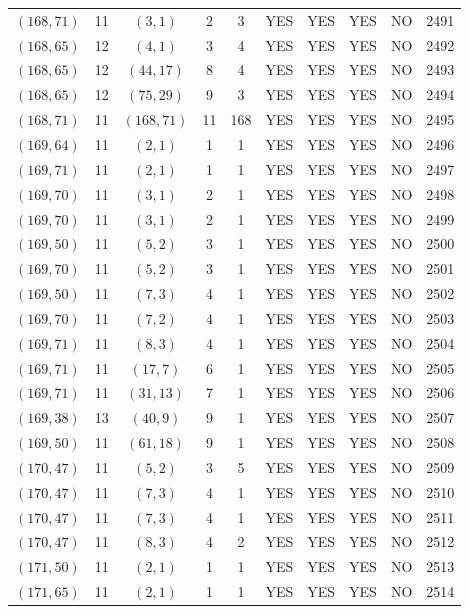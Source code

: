 \begin{longtable}{|c|c|c|c|c|c|c|c|c|c|}
$(168, 71)$ & 11 & $(3, 1)$ & 2 & 3 & YES & YES & YES & NO & 2491\\
$(168, 65)$ & 12 & $(4, 1)$ & 3 & 4 & YES & YES & YES & NO & 2492\\
$(168, 65)$ & 12 & $(44, 17)$ & 8 & 4 & YES & YES & YES & NO & 2493\\
$(168, 65)$ & 12 & $(75, 29)$ & 9 & 3 & YES & YES & YES & NO & 2494\\
$(168, 71)$ & 11 & $(168, 71)$ & 11 & 168 & YES & YES & YES & NO & 2495\\
$(169, 64)$ & 11 & $(2, 1)$ & 1 & 1 & YES & YES & YES & NO & 2496\\
$(169, 71)$ & 11 & $(2, 1)$ & 1 & 1 & YES & YES & YES & NO & 2497\\
$(169, 70)$ & 11 & $(3, 1)$ & 2 & 1 & YES & YES & YES & NO & 2498\\
$(169, 70)$ & 11 & $(3, 1)$ & 2 & 1 & YES & YES & YES & NO & 2499\\
$(169, 50)$ & 11 & $(5, 2)$ & 3 & 1 & YES & YES & YES & NO & 2500\\
$(169, 70)$ & 11 & $(5, 2)$ & 3 & 1 & YES & YES & YES & NO & 2501\\
$(169, 50)$ & 11 & $(7, 3)$ & 4 & 1 & YES & YES & YES & NO & 2502\\
$(169, 70)$ & 11 & $(7, 2)$ & 4 & 1 & YES & YES & YES & NO & 2503\\
$(169, 71)$ & 11 & $(8, 3)$ & 4 & 1 & YES & YES & YES & NO & 2504\\
$(169, 71)$ & 11 & $(17, 7)$ & 6 & 1 & YES & YES & YES & NO & 2505\\
$(169, 71)$ & 11 & $(31, 13)$ & 7 & 1 & YES & YES & YES & NO & 2506\\
$(169, 38)$ & 13 & $(40, 9)$ & 9 & 1 & YES & YES & YES & NO & 2507\\
$(169, 50)$ & 11 & $(61, 18)$ & 9 & 1 & YES & YES & YES & NO & 2508\\
$(170, 47)$ & 11 & $(5, 2)$ & 3 & 5 & YES & YES & YES & NO & 2509\\
$(170, 47)$ & 11 & $(7, 3)$ & 4 & 1 & YES & YES & YES & NO & 2510\\
$(170, 47)$ & 11 & $(7, 3)$ & 4 & 1 & YES & YES & YES & NO & 2511\\
$(170, 47)$ & 11 & $(8, 3)$ & 4 & 2 & YES & YES & YES & NO & 2512\\
$(171, 50)$ & 11 & $(2, 1)$ & 1 & 1 & YES & YES & YES & NO & 2513\\
$(171, 65)$ & 11 & $(2, 1)$ & 1 & 1 & YES & YES & YES & NO & 2514\\

\end{longtable}

